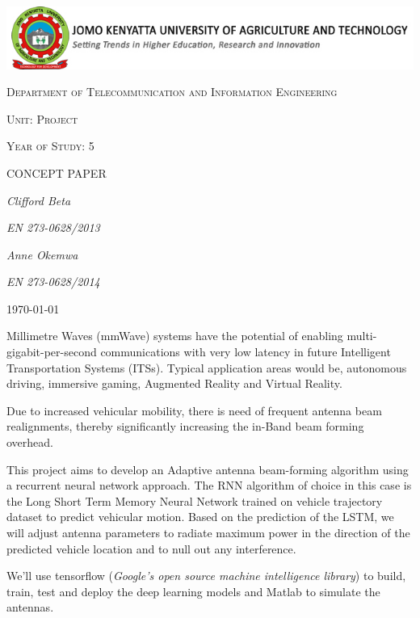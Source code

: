 \documentclass[12pt,a4paper]{article}
\begin{document}
\begin{titlepage}
	\centering
	\includegraphics[width=1.2\textwidth]{src/logo-jkuat.jpg}\par\vspace{1cm}
	\vspace{1cm}
	{\scshape\Large Department of Telecommunication and Information Engineering\par}
	\vspace{1cm}
	{\scshape\Large Unit: Project\par}
	\vspace{1cm}
	{\scshape\Large Year of Study: 5\par}
	\vspace{1cm}
	{\scshape\Large CONCEPT PAPER\par}
	\vspace{1cm}
	
	
	{\Large\itshape Clifford Beta \par}
	{\Large\itshape EN 273-0628/2013\par}
	{\Large\itshape Anne Okemwa \par}
	{\Large\itshape EN 273-0628/2014\par}
	\vfill




	{\large \today\par}

\end{titlepage}
\newpage
\par Millimetre Waves (mmWave) systems have the potential of enabling multi-gigabit-per-second communications with very low latency in future Intelligent Transportation Systems (ITSs). Typical application areas would be, autonomous driving, immersive gaming, Augmented Reality and Virtual Reality.

\par Due to increased vehicular mobility, there is need of frequent antenna beam realignments, thereby significantly increasing the in-Band beam forming overhead.

\par This project aims to develop an Adaptive antenna beam-forming algorithm using a recurrent neural network approach. The RNN algorithm of choice in this case is the Long Short Term Memory Neural Network trained on vehicle trajectory dataset to predict vehicular motion.
Based on the prediction of the LSTM, we will adjust antenna parameters to radiate maximum power in the direction of the predicted vehicle location and to null out any
interference.
\par We'll use tensorflow (\emph {Google's open source machine intelligence library}) to build, train, test and deploy the deep learning models and Matlab to simulate the antennas. 
\end{document}

